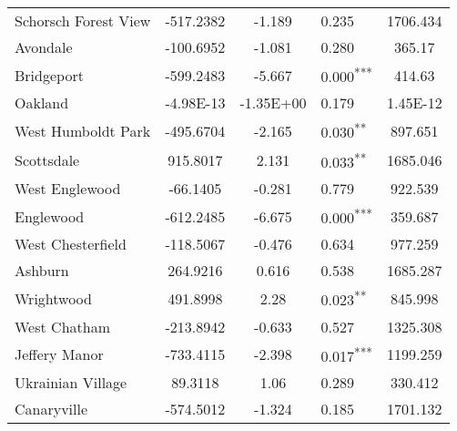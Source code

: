 \documentclass[12pt]{report}
\begin{document}
\begin{longtable}{l S[table-format=6.4] S[table-format=3.4] l S[table-format=4.4]}
	Schorsch Forest View         & -517.2382            & -1.189           & 0.235                      & 1706.434                          \\
	Avondale                     & -100.6952            & -1.081           & 0.280                      & 365.17                            \\
	Bridgeport                   & -599.2483            & -5.667           & 0.000\textsuperscript{***} & 414.63                            \\
	Oakland                      & -4.98E-13            & -1.35E+00        & 0.179                      & 1.45E-12                          \\
	West Humboldt Park           & -495.6704            & -2.165           & 0.030\textsuperscript{**}  & 897.651                           \\
	Scottsdale                   & 915.8017             & 2.131            & 0.033\textsuperscript{**}  & 1685.046                          \\
	West Englewood               & -66.1405             & -0.281           & 0.779                      & 922.539                           \\
	Englewood                    & -612.2485            & -6.675           & 0.000\textsuperscript{***} & 359.687                           \\
	West Chesterfield            & -118.5067            & -0.476           & 0.634                      & 977.259                           \\
	Ashburn                      & 264.9216             & 0.616            & 0.538                      & 1685.287                          \\
	Wrightwood                   & 491.8998             & 2.28             & 0.023\textsuperscript{**}  & 845.998                           \\
	West Chatham                 & -213.8942            & -0.633           & 0.527                      & 1325.308                          \\
	Jeffery Manor                & -733.4115            & -2.398           & 0.017\textsuperscript{***} & 1199.259                          \\
	Ukrainian Village            & 89.3118              & 1.06             & 0.289                      & 330.412                           \\
	Canaryville                  & -574.5012            & -1.324           & 0.185                      & 1701.132                          \\

\end{longtable}
\end{document}
